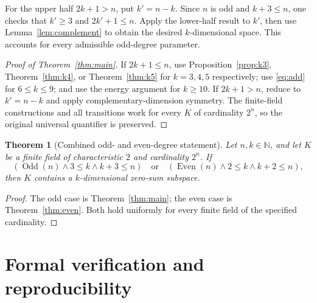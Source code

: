 \documentclass[11pt]{amsart}
\numberwithin{equation}{section}
\newtheorem{theorem}{Theorem}[section]
\theoremstyle{definition}
\theoremstyle{remark}
\begin{document}
For the upper half $2k+1>n$, put $k'=n-k$. Since $n$ is odd and $k+3\le n$, one checks that $k'\ge3$ and $2k'+1\le n$. Apply the lower-half result to $k'$, then use Lemma~\ref{lem:complement} to obtain the desired $k$-dimensional space. This accounts for every admissible odd-degree parameter.

\begin{proof}[Proof of Theorem~\ref{thm:main}]
If $2k+1\le n$, use Proposition~\ref{prop:k3}, Theorem~\ref{thm:k4}, or Theorem~\ref{thm:k5} for $k=3,4,5$ respectively; use \eqref{eq:add} for $6\le k\le9$; and use the energy argument for $k\ge10$. If $2k+1>n$, reduce to $k'=n-k$ and apply complementary-dimension symmetry. The finite-field constructions and all transitions work for every $K$ of cardinality $2^n$, so the original universal quantifier is preserved.
\end{proof}

\begin{theorem}[Combined odd- and even-degree statement]\label{thm:full}
Let $n,k\in\mathbb N$, and let $K$ be a finite field of characteristic $2$ and cardinality $2^n$. If
\[
 (\operatorname{Odd}(n)\land 3\le k\land k+3\le n)
 \quad\text{or}\quad
 (\operatorname{Even}(n)\land 2\le k\land k+2\le n),
\]
then $K$ contains a $k$-dimensional zero-sum subspace.
\end{theorem}
\begin{proof}
The odd case is Theorem~\ref{thm:main}; the even case is Theorem~\ref{thm:even}. Both hold uniformly for every finite field of the specified cardinality.
\end{proof}

\section{Formal verification and reproducibility}\label{sec:formal}
\sloppy
\end{document}
